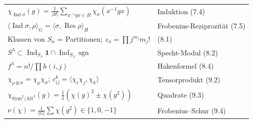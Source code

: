 \begin{merksatz}
\begin{center}
{\begin{tabular}{@{}P{4.8cm}P{3.8cm}@{}}
$\chi_{\operatorname{Ind}\sigma}(g) = \frac1{|H|}\sum_{x^{-1}gx\in H}\chi_\sigma(x^{-1}gx)$ & Induktion (7.4)\\
$\langle\operatorname{Ind}\sigma, \rho\rangle_G = \langle\sigma, \operatorname{Res}\rho\rangle_H$ & Frobenius-Reziprozität (7.5)\\
Klassen von $S_n$ = Partitionen; $z_\lambda = \prod j^{m_j}m_j!$ & (8.1)\\
$S^{\lambda}\subset\operatorname{Ind}_{S_\lambda}\mathbf 1\cap\operatorname{Ind}_{S_{\lambda'}}\mathrm{sgn}$ & Specht-Modul (8.2)\\
$f^{\lambda} = n!/\prod h(i, j)$ & Hakenformel (8.4)\\
$\chi_{\rho\otimes\sigma} = \chi_\rho\chi_\sigma$; $c_{ij}^{k} = \langle\chi_i\chi_j, \chi_k\rangle$ & Tensorprodukt (9.2)\\
$\chi_{\mathrm{Sym}^{2}/\mathrm{Alt}^{2}}(g) = \frac12(\chi(g)^{2}\pm\chi(g^{2}))$ & Quadrate (9.3)\\
$\nu(\chi) = \frac1{|G|}\sum\chi(g^{2})\in\{1, 0, -1\}$ & Frobenius--Schur (9.4)\\
\bottomrule
\end{tabular}}
\end{center}
\end{merksatz}

